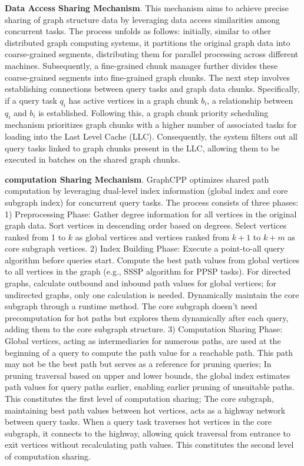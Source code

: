 \documentclass[lettersize,journal]{IEEEtran} %
\begin{document}
{\bf{Data Access Sharing Mechanism}}. This mechanism aims to achieve precise sharing of graph structure data by leveraging data access similarities among concurrent tasks. The process unfolds as follows: initially, similar to other distributed graph computing systems\cite{cgraph}\cite{multilyra}, it partitions the original graph data into coarse-grained segments, distributing them for parallel processing across different machines. Subsequently, a fine-grained chunk manager further divides these coarse-grained segments into fine-grained graph chunks. The next step involves establishing connections between query tasks and graph data chunks. Specifically, if a query task $q_i$ has active vertices in a graph chunk $b_i$, a relationship between $q_i$ and $b_i$ is established. Following this, a graph chunk priority scheduling mechanism prioritizes graph chunks with a higher number of associated tasks for loading into the Last Level Cache (LLC). Consequently, the system filters out all query tasks linked to graph chunks present in the LLC, allowing them to be executed in batches on the shared graph chunks.

{\bf{computation Sharing Mechanism}}. GraphCPP optimizes shared path computation by leveraging dual-level index information (global index and core subgraph index) for concurrent query tasks. The process consists of three phases: 1) Preprocessing Phase: Gather degree information for all vertices in the original graph data. Sort vertices in descending order based on degrees. Select vertices ranked from 1 to $k$ as global vertices and vertices ranked from $k+1$ to $k+m$ as core subgraph vertices. 2) Index Building Phase: Execute a point-to-all query algorithm before queries start. Compute the best path values from global vertices to all vertices in the graph (e.g., SSSP algorithm for PPSP tasks). For directed graphs, calculate outbound and inbound path values for global vertices; for undirected graphs, only one calculation is needed. Dynamically maintain the core subgraph through a runtime method. The core subgraph doesn't need precomputation for hot paths but explores them dynamically after each query, adding them to the core subgraph structure. 3) Computation Sharing Phase: Global vertices, acting as intermediaries for numerous paths, are used at the beginning of a query to compute the path value for a reachable path. This path may not be the best path but serves as a reference for pruning queries; In pruning traversal based on upper and lower bounds, the global index estimates path values for query paths earlier, enabling earlier pruning of unsuitable paths. This constitutes the first level of computation sharing; The core subgraph, maintaining best path values between hot vertices, acts as a highway network between query tasks. When a query task traverses hot vertices in the core subgraph, it connects to the highway, allowing quick traversal from entrance to exit vertices without recalculating path values. This constitutes the second level of computation sharing.
\end{document}
